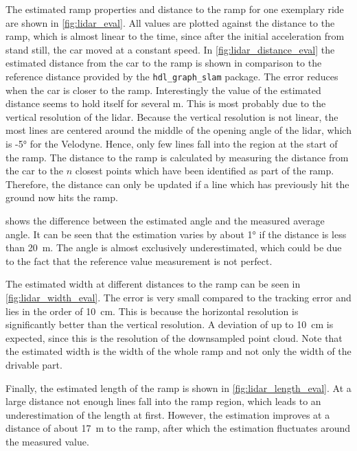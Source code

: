 \renewcommand{\arraystretch}{1.2}
The estimated ramp properties and distance to the ramp for one exemplary ride are shown in \cref{fig:lidar_eval}.
All values are plotted against the distance to the ramp, which is almost linear to the time, since after the initial acceleration from stand still, the car moved at a constant speed.
In \cref{fig:lidar_distance_eval} the estimated distance from the car to the ramp is shown in comparison to the reference distance provided by the \texttt{hdl\_graph\_slam} package.
The error reduces when the car is closer to the ramp.
Interestingly the value of the estimated distance seems to hold itself for several \si{\metre}.
This is most probably due to the vertical resolution of the \gls{lidar}.
Because the vertical resolution is not linear, the most lines are centered around the middle of the opening angle of the \gls{lidar}, which is -\ang{5} for the Velodyne.
Hence, only few lines fall into the region at the start of the ramp.
The distance to the ramp is calculated by measuring the distance from the car to the $n$ closest points which have been identified as part of the ramp.
Therefore, the distance can only be updated if a line which has previously hit the ground now hits the ramp.

 shows the difference between the estimated angle and the measured average angle.
It can be seen that the estimation varies by about \ang{1} if the distance is less than \SI{20}{\metre}.
The angle is almost exclusively underestimated, which could be due to the fact that the reference value measurement is not perfect.

The estimated width at different distances to the ramp can be seen in \cref{fig:lidar_width_eval}.
The error is very small compared to the tracking error and lies in the order of \SI{10}{\cm}.
This is because the horizontal resolution is significantly better than the vertical resolution.
A deviation of up to \SI{10}{\cm} is expected, since this is the resolution of the downsampled point cloud.
Note that the estimated width is the width of the whole ramp and not only the width of the drivable part.

Finally, the estimated length of the ramp is shown in \cref{fig:lidar_length_eval}.
At a large distance not enough lines fall into the ramp region, which leads to an underestimation of the length at first.
However, the estimation improves at a distance of about \SI{17}{\metre} to the ramp, after which the estimation fluctuates around the measured value.

